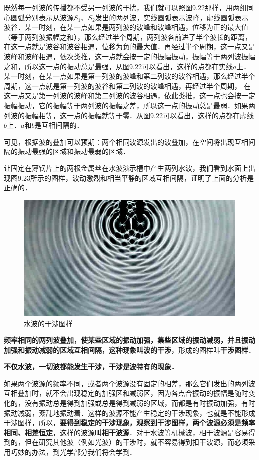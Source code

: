 既然每一列波的传播都不受另一列波的干扰，我们就可以照图9.22那样，用两组同心圆弧分别表示从波源$S_1$、$S_2$发出的两列波，实线圆弧表示波峰，虚线圆弧表示波谷．某一时刻，在某一点如果是两列波的波峰和波峰相遇，位移为正的最大值（等于两列波振幅之和），那么经过半个周期，两列波各前进了半个波长的距离，在这一点就是波谷和波谷相遇，位移为负的最大值．再经过半个周期，这一点又是波峰和波峰相遇，依次类推，这一点就会按一定的振幅振动，振幅等于两列波振幅之和，所以这一点的振动总是最强，从图9.22可以看出，这样的点都在实线$a$上．某一时刻，在某一点如果是第一列波的波峰和第二列波的波谷相遇，那么经过半个周期，这一点就是第一列波的波谷和第二列波的波峰相遇，再经过半个周期，
在这一点又是第一列波的波峰和第二列波的波谷相遇，依此类推，这一点也会按一定振幅振动，它的振幅等于两列波的振幅之差，所以这一点的振动总是最弱．如果两列波的振幅相等，这一点的振幅就等于零．从图9.22可以看出，这样的点都在虚线$b$上．$a$和$b$是互相间隔的．

可见，根据波的叠加可以预期：两个相同波源发出的波叠加，在空间将出现互相间隔的振动最强的区域和振动最弱的区域．

让固定在薄钢片上的两根金属丝在水波演示槽中产生两列水波，我们看到水面上出现图9.23所示的图样，波动激烈和相当平静的区域互相间隔，证明了上面的分析是正确的．
\begin{figure}[H]\centering
    \includegraphics[scale=.6]{figure/9-23.jpg}
    \caption{水波的干涉图样}
\end{figure}

\textbf{频率相同的两列波叠加，使某些区域的振动加强，集些区域的振动减弱，并且振动加强和振动减弱的区域互相间隔，这种现象叫波的干涉}，形成的图样叫\textbf{干涉图样}．

\textbf{不仅水波，一切波都能发生干涉，干涉是波特有的现象．}

如果两个波源的频率不同，或者两个波源没有固定的相差，那么它们发出的两列波互相叠加时，就不会出现稳定的加强区和减弱区，因为各点合振动的振幅是随时变化的，没有振动总是得到加强或总是得到减弱的区域，而都是有时振动加强，有时振动减弱，紊乱地振动着．这样的波源不能产生稳定的干涉现象，也就是不能形成干涉图样，所以，\textbf{要得到稳定的干涉现象，观察到干涉图样，两个波源必须是频率相同、相差恒定}，这样的波源叫\textbf{相干波源}．对于水波等机械波，相干波源是容易得到的，但在研究其他波（例如光波）的干涉时，就不容易得到扣干波源，而必须采用巧妙的办法，到光学部分我们将会学到．

